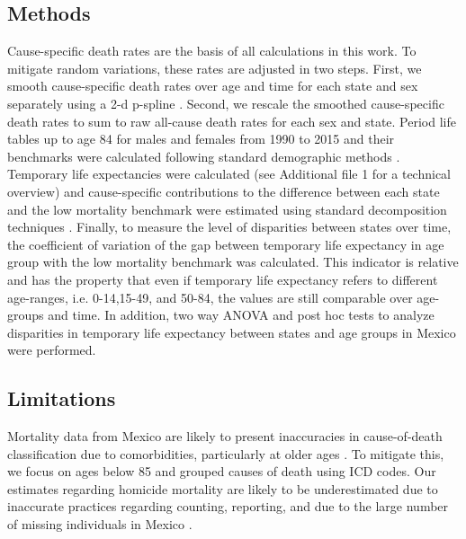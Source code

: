 \documentclass{bmcart}
\begin{document}
\subsection*{Methods}

Cause-specific death rates are the basis of all calculations in this work. To mitigate random variations, these rates are adjusted in two steps. First, we smooth cause-specific death rates over age and time for each state and sex separately using a 2-d p-spline \cite{GC2012}. Second, we rescale the smoothed cause-specific death rates to sum to raw all-cause death rates for each sex and state. Period life tables up to
age 84 for males and females from 1990 to 2015 and their benchmarks were calculated following standard demographic methods \cite{HMDMP}. Temporary life expectancies were calculated \cite{arriaga1984} (see Additional file 1 for a technical overview) and  cause-specific contributions to the difference between
each state and the low mortality benchmark were estimated using
standard decomposition techniques \cite{horiuchi2008}. Finally, to measure the level of disparities between states over time, the coefficient of variation of the gap between temporary life expectancy in age group with the low mortality benchmark was calculated. This indicator is relative and has the property that even if temporary life expectancy refers to different age-ranges, i.e. 0-14,15-49, and 50-84, the values are still comparable over age-groups and time.  In addition, two way ANOVA and post hoc tests to analyze disparities in temporary life expectancy between states and age groups in Mexico were performed. 



\subsection*{Limitations}
Mortality data from Mexico are
likely to present inaccuracies in cause-of-death classification due to
comorbidities, particularly at older ages \cite{hernandez2011assessing}. To mitigate this,
we focus on ages below 85 and grouped causes of death using ICD codes.
Our estimates regarding homicide mortality are likely to be
underestimated due to inaccurate practices regarding counting, reporting,
and due to the large number of missing individuals in Mexico \cite{HRW2011}.
\end{document}
